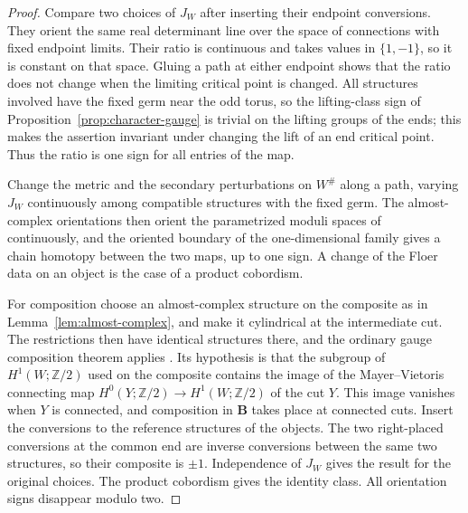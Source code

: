 \documentclass[11pt]{amsart}
\theoremstyle{definition}
\theoremstyle{remark}
\theoremstyle{plain}
\numberwithin{equation}{section}
\newcommand{\ZZ}{\mathbb Z}
\begin{document}
\begin{proof}
Compare two choices of $J_W$ after inserting their endpoint
conversions. They orient the same real determinant line over
the space of connections with fixed endpoint limits. Their
ratio is continuous and takes values in $\{1,-1\}$, so it is
constant on that space. Gluing a path at either endpoint
shows that the ratio does not change when the limiting
critical point is changed. All structures involved have the fixed
germ near the odd torus, so the lifting-class sign of
Proposition~\ref{prop:character-gauge} is trivial on the lifting
groups of the ends; this makes the assertion invariant under changing
the lift of an end critical point. Thus the ratio is one sign for all entries
of the map.

Change the metric and the secondary perturbations on $W^\#$
along a path, varying $J_W$ continuously among compatible
structures with the fixed germ. The almost-complex orientations
then orient the parametrized moduli spaces
of~\cite[Section~3.9]{KM-unknot} continuously, and the oriented
boundary of the one-dimensional family gives a chain homotopy
between the two maps, up to one sign. A change of the Floer data
on an object is the case of a product cobordism.

For composition choose an almost-complex structure on the composite as in Lemma~\ref{lem:almost-complex}, and make it cylindrical at the intermediate
cut. The restrictions then have identical structures there,
and the ordinary gauge composition theorem applies
\cite[Proposition~5.4]{KM-unknot}. Its hypothesis is that the
subgroup of $H^1(W;\ZZ/2)$ used on the composite contains the image
of the Mayer--Vietoris connecting map $H^0(Y;\ZZ/2)\to H^1(W;\ZZ/2)$
of the cut $Y$. This image vanishes when $Y$ is connected, and
composition in $\mathbf B$ takes place at connected cuts. Insert the
conversions to the reference structures of the objects. The two right-placed
conversions at the common end are inverse conversions between the
same two structures, so their composite is $\pm1$. Independence of $J_W$ gives the result
for the original choices. The product cobordism gives the
identity class. All orientation signs disappear modulo two.
\end{proof}
\end{document}
